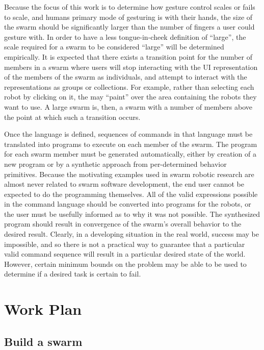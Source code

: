 \documentclass[]{article}
\begin{document}
Because the focus of this work is to determine how gesture control scales or fails to scale, and humans primary mode of gesturing is with their hands, the size of the swarm should be significantly larger than the number of fingers a user could gesture with. 
In order to have a less tongue-in-cheek definition of ``large'', the scale required for a swarm to be considered ``large'' will be determined empirically.
It is expected that there exists a transition point for the number of members in a swarm where users will stop interacting with the UI representation of the members of the swarm as individuals, and attempt to interact with the representations as groups or collections. 
For example, rather than selecting each robot by clicking on it, the may ``paint'' over the area containing the robots they want to use. 
A large swarm is, then, a swarm with a number of members above the point at which such a transition occurs. 

Once the language is defined, sequences of commands in that language must be translated into programs to execute on each member of the swarm. 
The program for each swarm member must be generated automatically, either by creation of a new program or by a synthetic approach from per-determined behavior primitives.
Because the motivating examples used in swarm robotic research are almost never related to swarm software development, the end user cannot be expected to do the programming themselves. 
All of the valid expressions possible in the command language should be converted into programs for the robots, or the user must be usefully informed as to why it was not possible. 
The synthesized program should result in convergence of the swarm's overall behavior to the desired result. 
Clearly, in a developing situation in the real world, success may be impossible, and so there is not a practical way to guarantee that a particular valid command sequence will result in a particular desired state of the world. 
However, certain minimum bounds on the problem may be able to be used to determine if a desired task is certain to fail.



\section{Work Plan}

\subsection{Build a swarm}
\end{document}
